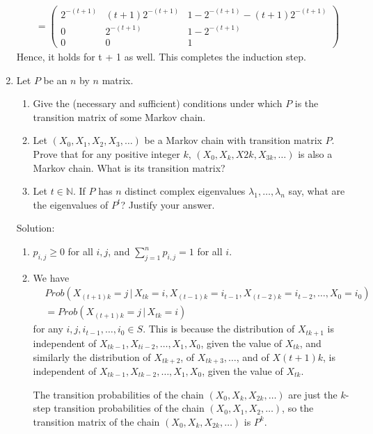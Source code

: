 \documentclass[11pt,a4paper]{report}
\begin{document}
\begin{enumerate}
\begin{align*}
            &=
            \begin{pmatrix}
                2^{-(t+1)} & (t+1)2^{-(t+1)} & 1-2^{-(t+1)}-(t+1)2^{-(t+1)}\\
                0 & 2^{-(t+1)} & 1-2^{-(t+1)}\\
                0 & 0 & 1
            \end{pmatrix}
        \end{align*}
        Hence, it holds for t + 1 as well. This completes the induction step.
        \item Let $P$ be an $n$ by $n$ matrix.
        \begin{enumerate}
            \item Give the (necessary and sufficient) conditions under which $P$ is the transition matrix of some Markov chain.
            \item Let $(X_0, X_1, X_2, X_3,\ldots)$ be a Markov chain with transition matrix $P$. Prove that for any positive integer $k$, $(X_0, X_k, X2k, X_{3k},\ldots)$ is also a Markov chain. What is its transition matrix?
            \item  Let $t \in \mathbb{N}$. If $P$ has $n$ distinct complex eigenvalues $\lambda_1, \ldots , \lambda_n$ say, what are the eigenvalues of $P^t$? Justify your answer.            
        \end{enumerate}
        Solution:
        \begin{enumerate}
            \item $p_{i,j} \geq 0$ for all $i, j$, and $\sum_{j=1}^np_{i,j}=1$ for all $i$.
            \item We have
            \begin{align*}
                & Prob(X_{(t+1)k} = j\,|\, X_{tk}=i, X_{(t-1)k}=i_{t-1}, X_{(t-2)k}=i_{t-2},\ldots,X_0=i_0)\\
                & = Prob(X_{(t+1)k}=j\,|\, X_{tk}=i)
            \end{align*}
            for any $i, j, i_{t−1}, \ldots , i_0 \in S$. This is because the distribution of $X_{tk+1}$ is independent of $X_{tk−1}, X_{ti−2}, \ldots , X_1, X_0$, given the value of $X_{tk}$, and similarly the distribution of $X_{tk+2}$, of $X_{tk+3}, \ldots $, and of $X(t+1)k$, is independent of $X_{tk−1}, X_{tk−2}, \ldots , X_1, X_0$, given the value of $X_{tk}$.\par
            The transition probabilities of the chain $(X_0, X_k, X_{2k}, \ldots)$ are just the $k$-step transition probabilities of the chain $(X_0, X_1, X_2, \ldots)$, so the transition matrix of the chain $(X_0, X_k, X_{2k}, \ldots)$ is $P^k$.

\end{enumerate}
\end{enumerate}
\end{document}
